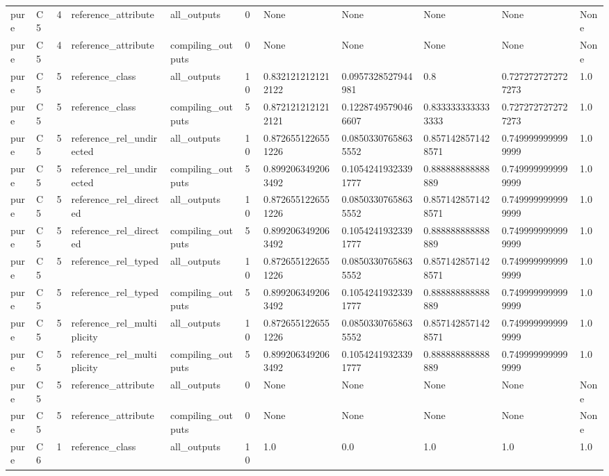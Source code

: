 \begin{tabular}{lllllllllll}
pure & C5 & 4 & reference\_attribute & all\_outputs & 0 & None & None & None & None & None \\
pure & C5 & 4 & reference\_attribute & compiling\_outputs & 0 & None & None & None & None & None \\
pure & C5 & 5 & reference\_class & all\_outputs & 10 & 0.8321212121212122 & 0.0957328527944981 & 0.8 & 0.7272727272727273 & 1.0 \\
pure & C5 & 5 & reference\_class & compiling\_outputs & 5 & 0.8721212121212121 & 0.12287495790466607 & 0.8333333333333333 & 0.7272727272727273 & 1.0 \\
pure & C5 & 5 & reference\_rel\_undirected & all\_outputs & 10 & 0.8726551226551226 & 0.08503307658635552 & 0.8571428571428571 & 0.7499999999999999 & 1.0 \\
pure & C5 & 5 & reference\_rel\_undirected & compiling\_outputs & 5 & 0.8992063492063492 & 0.10542419323391777 & 0.888888888888889 & 0.7499999999999999 & 1.0 \\
pure & C5 & 5 & reference\_rel\_directed & all\_outputs & 10 & 0.8726551226551226 & 0.08503307658635552 & 0.8571428571428571 & 0.7499999999999999 & 1.0 \\
pure & C5 & 5 & reference\_rel\_directed & compiling\_outputs & 5 & 0.8992063492063492 & 0.10542419323391777 & 0.888888888888889 & 0.7499999999999999 & 1.0 \\
pure & C5 & 5 & reference\_rel\_typed & all\_outputs & 10 & 0.8726551226551226 & 0.08503307658635552 & 0.8571428571428571 & 0.7499999999999999 & 1.0 \\
pure & C5 & 5 & reference\_rel\_typed & compiling\_outputs & 5 & 0.8992063492063492 & 0.10542419323391777 & 0.888888888888889 & 0.7499999999999999 & 1.0 \\
pure & C5 & 5 & reference\_rel\_multiplicity & all\_outputs & 10 & 0.8726551226551226 & 0.08503307658635552 & 0.8571428571428571 & 0.7499999999999999 & 1.0 \\
pure & C5 & 5 & reference\_rel\_multiplicity & compiling\_outputs & 5 & 0.8992063492063492 & 0.10542419323391777 & 0.888888888888889 & 0.7499999999999999 & 1.0 \\
pure & C5 & 5 & reference\_attribute & all\_outputs & 0 & None & None & None & None & None \\
pure & C5 & 5 & reference\_attribute & compiling\_outputs & 0 & None & None & None & None & None \\
pure & C6 & 1 & reference\_class & all\_outputs & 10 & 1.0 & 0.0 & 1.0 & 1.0 & 1.0 \\

\end{tabular}
